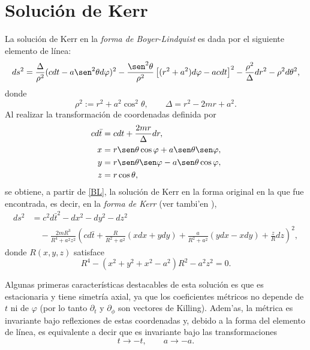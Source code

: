 \section{Soluci\'on de Kerr}
La soluci\'on de Kerr en la \textit{forma de Boyer-Lindquist} es dada por el siguiente elemento de l\'inea:
 \begin{equation}
ds^2=\frac{\Delta}{\rho^2}(cdt-a\sen^2\theta d\varphi)^2-\frac{\sen^2\theta}{\rho^2}\left[(r^2+a^2)d\varphi-acdt \right]^2-\frac{\rho^2}{\Delta}dr^2-\rho^2d\theta^2, \label{BL}
 \end{equation}
donde
\begin{equation}
\rho^2:=r^2+a^2\cos^2\theta,\qquad \Delta=r^2-2mr+a^2.
\end{equation}
Al realizar la transformaci\'on de coordenadas definida por
\begin{equation}
\begin{aligned}
cd\bar{t}&=cdt+\frac{2mr}{\Delta}dr,\\
x&=r\sen\theta\cos\varphi+a\sen\theta\sen\varphi, \\
y&=r\sen\theta\sen\varphi-a\sen\theta\cos\varphi, \\
z&=r\cos\theta,   \label{zrt}
\end{aligned}
\end{equation}
se obtiene, a partir de \eqref{BL}, la soluci\'on de Kerr en la forma original en la que fue encontrada, es decir, en la \textit{forma de Kerr} \cite{Kerr63} (ver tambi'en \cite{Kerr65}),
\begin{align}
ds^2 &= c^2d\bar{t}^2-dx^2-dy^2-dz^2 \nonumber \\
&\quad -\frac{2mR^3}{R^4+a^2z^2}\left(cd\bar{t}+\frac{R}{R^2+a^2}(xdx+ydy)+\frac{a}{R^2+a^2}(ydx-xdy)+\frac{z}{R}dz \right)^2 , \label{Kerr}
\end{align}
donde $R(x,y,z)$ satisface
\begin{equation}
R^4 - (x^2+y^2+x^2-a^2)R^2 -a^2z^2=0.
\end{equation}

Algunas primeras caracter\'isticas destacables de esta soluci\'on es que es estacionaria y tiene simetr\'ia axial, ya que los coeficientes m\'etricos no depende de $t$ ni de $\varphi$ (por lo tanto $\partial_t$ y $\partial_\phi$ son vectores de Killing). Adem'as, la m\'etrica es invariante bajo reflexiones de estas coordenadas y, debido a la forma del elemento de l\'inea, es equivalente a decir que es invariante bajo las transformaciones
\begin{equation}
t\rightarrow -t, \qquad a\rightarrow -a.
\end{equation}

